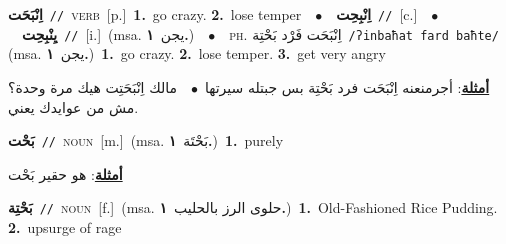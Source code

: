 \documentclass[10pt,a4paper,twoside]{article} %
\begin{document}
\begin{multicols}{2}
{\setlength\topsep{0pt}\textbf{\foreignlanguage{arabic}{اِنْبَحَت}}\ {\color{gray}\texttt{//}\color{black}}\ \textsc{verb}\ [p.]\ \textbf{1.}~go crazy.  \textbf{2.}~lose temper\ \ $\bullet$\ \ \setlength\topsep{0pt}\textbf{\foreignlanguage{arabic}{اِنْبِحِت}}\ {\color{gray}\texttt{//}\color{black}}\ [c.]\ \ $\bullet$\ \ \setlength\topsep{0pt}\textbf{\foreignlanguage{arabic}{يِنْبِحِت}}\ {\color{gray}\texttt{//}\color{black}}\ [i.]\ \color{gray}(msa. \foreignlanguage{arabic}{يجن}~\foreignlanguage{arabic}{\textbf{١.}})\color{black}\ \ $\bullet$\ \ \textsc{ph.} \color{gray} \foreignlanguage{arabic}{اِنْبَحَت فَرْد بَحْتِة}\color{black}\ {\color{gray}\texttt{/{\sffamily ʔinbaħat fard baħte}/}\color{black}}\ \color{gray} (msa. \foreignlanguage{arabic}{يجن}~\foreignlanguage{arabic}{\textbf{١.}})\color{black}\ \textbf{1.}~go crazy.  \textbf{2.}~lose temper.  \textbf{3.}~get very angry\  \begin{flushright}\color{gray}\foreignlanguage{arabic}{\textbf{\underline{\foreignlanguage{arabic}{أمثلة}}}: أجرمنعنه اِنْبَحَت فرد بَحْتِة بس جبتله سيرتها\ $\bullet$\ \  مالك اِنْبَحَتِت هيك مرة وحدة؟ مش من عوايدك يعني.}\end{flushright}\color{black}} \vspace{2mm}

{\setlength\topsep{0pt}\textbf{\foreignlanguage{arabic}{بَحْت}}\ {\color{gray}\texttt{//}\color{black}}\ \textsc{noun}\ [m.]\ \color{gray}(msa. \foreignlanguage{arabic}{بَحْتَة}~\foreignlanguage{arabic}{\textbf{١.}})\color{black}\ \textbf{1.}~purely\  \begin{flushright}\color{gray}\foreignlanguage{arabic}{\textbf{\underline{\foreignlanguage{arabic}{أمثلة}}}: هو حقير بَحْت}\end{flushright}\color{black}} \vspace{2mm}

{\setlength\topsep{0pt}\textbf{\foreignlanguage{arabic}{بَحْتِة}}\ {\color{gray}\texttt{//}\color{black}}\ \textsc{noun}\ [f.]\ \color{gray}(msa. \foreignlanguage{arabic}{حلوى الرز بالحليب}~\foreignlanguage{arabic}{\textbf{١.}})\color{black}\ \textbf{1.}~Old-Fashioned Rice Pudding.  \textbf{2.}~upsurge of rage\ } \vspace{2mm}


\end{multicols}
\end{document}

